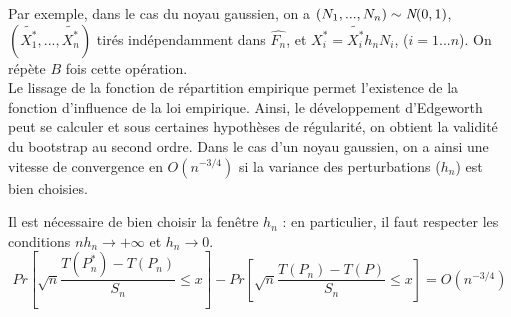 \documentclass{article}
\renewcommand*{\(}{ \left( }
\renewcommand*{\)}{ \right) }
\begin{document}
Par exemple, dans le cas du noyau gaussien, on a $(N_1, ...,N_n) \sim \emph{N}(0,1)$, $(\tilde{X^*_1},...,\tilde{X^*_n})$ tirés indépendamment dans $\hat{F_n}$, et $X_i^* = \tilde{X^*_i}h_nN_i$, ($i=1...n$). On répète $B$ fois cette opération.\\

Le lissage de la fonction de répartition empirique permet l'existence de la fonction d'influence de la loi empirique. Ainsi, le développement d'Edgeworth peut se calculer et sous certaines hypothèses de régularité, on obtient la validité du bootstrap au second ordre. Dans le cas d'un noyau gaussien, on a ainsi une vitesse de convergence en $O(n^{-3/4})$ si la variance des perturbations ($h_n$) est bien choisies.

Il est nécessaire de bien choisir la fenêtre $h_n$ : en particulier, il faut respecter les conditions 
$nh_n \rightarrow +\infty$ et $h_n \rightarrow 0$.
\[
Pr\left[ \sqrt{n}\frac{T(P^*_n)-T(P_n)}{S_n} \leq x\right]-Pr\left[\sqrt{n}\frac{T(P_n)-T(P)}{S_n} \leq x \right]=O\(n^{-3/4}\)
\]
\end{document}
